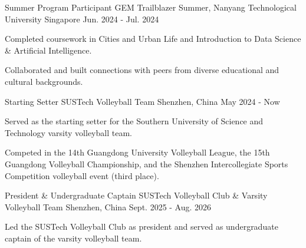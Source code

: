 

\begin{cventries}

  \cventry
    {Summer Program Participant} %
    {GEM Trailblazer Summer, Nanyang Technological University} %
    {Singapore} %
    {Jun. 2024 - Jul. 2024} %
    {
      \begin{cvitems} %
        \item {Completed coursework in Cities and Urban Life and Introduction to Data Science \& Artificial Intelligence.}
        \item {Collaborated and built connections with peers from diverse educational and cultural backgrounds.}
      \end{cvitems}
    }

  \cventry
    {Starting Setter} %
    {SUSTech Volleyball Team} %
    {Shenzhen, China} %
    {May 2024 - Now} %
    {
      \begin{cvitems} %
        \item {Served as the starting setter for the Southern University of Science and Technology varsity volleyball team.}
        \item {Competed in the 14th Guangdong University Volleyball League, the 15th Guangdong Volleyball Championship, and the Shenzhen Intercollegiate Sports Competition volleyball event (third place).}
      \end{cvitems}
    }

  \cventry
    {President \& Undergraduate Captain} %
    {SUSTech Volleyball Club \& Varsity Volleyball Team} %
    {Shenzhen, China} %
    {Sept. 2025 - Aug. 2026} %
    {
      \begin{cvitems} %
        \item {Led the SUSTech Volleyball Club as president and served as undergraduate captain of the varsity volleyball team.}
      \end{cvitems}
    }

\end{cventries}
